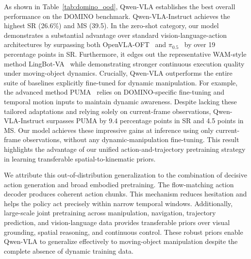 \documentclass{llmxive}
\begin{document}
As shown in Table~\ref{tab:domino_ood}, Qwen-VLA establishes the best overall performance on the DOMINO benchmark. Qwen-VLA-Instruct achieves the highest SR (26.6\%) and MS (39.5). In the zero-shot category, our model demonstrates a substantial advantage over standard vision-language-action architectures by surpassing both OpenVLA-OFT~\citep{kim2025fine} and $\pi_{0.5}$~\citep{black2025pi05} by over 19 percentage points in SR. Furthermore, it edges out the representative WAM-style method LingBot-VA~\citep{li2026causal} while demonstrating stronger continuous execution quality under moving-object dynamics. Crucially, Qwen-VLA outperforms the entire suite of baselines explicitly fine-tuned for dynamic manipulation. For example, the advanced method PUMA~\citep{fang2026towards} relies on DOMINO-specific fine-tuning and temporal motion inputs to maintain dynamic awareness. Despite lacking these tailored adaptations and relying solely on current-frame observations, Qwen-VLA-Instruct surpasses PUMA by 9.4 percentage points in SR and 4.5 points in MS. Our model achieves these impressive gains at inference using only current-frame observations, without any dynamic-manipulation fine-tuning. This result highlights the advantage of our unified action-and-trajectory pretraining strategy in learning transferable spatial-to-kinematic priors.


We attribute this out-of-distribution generalization to the combination of decisive action generation and broad embodied pretraining. The flow-matching action decoder produces coherent action chunks. This mechanism reduces hesitation and helps the policy act precisely within narrow temporal windows. Additionally, large-scale joint pretraining across manipulation, navigation, trajectory prediction, and vision-language data provides transferable priors over visual grounding, spatial reasoning, and continuous control. These robust priors enable Qwen-VLA to generalize effectively to moving-object manipulation despite the complete absence of dynamic training data.
\end{document}
